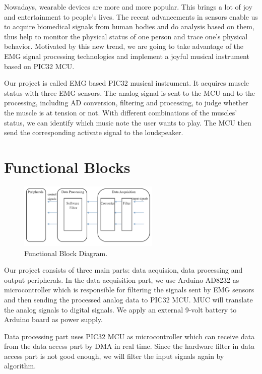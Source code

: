 \documentclass[12pt]{article}
\begin{document}
Nowadays, wearable devices are more and more popular. This brings a lot of joy and entertainment to people’s lives. The recent advancements in sensors enable us to acquire biomedical signals from human bodies and do analysis based on them, thus help to monitor the physical status of one person and trace one’s physical behavior. Motivated by this new trend, we are going to take advantage of the EMG signal processing technologies and implement a joyful musical instrument based on PIC32 MCU. 

Our project is called EMG based PIC32 musical instrument. It acquires muscle status with three EMG sensors. The analog signal is sent to the MCU and to the processing, including AD conversion, filtering and processing, to judge whether the muscle is at tension or not. With different combinations of the muscles’ status, we can identify which music note the user wants to play. The MCU then send the corresponding activate signal to the loudspeaker.


\section{Functional Blocks}
\begin{figure}[H]
\centering
\includegraphics[width=0.6\textwidth]{block-diagram.png}
\caption{Functional Block Diagram.}
\end{figure}

Our project consists of three main parts: data acquision, data processing and output peripherals. In the data acquisition part, we use Arduino AD8232 as microcontroller which is responsible for filtering the signals sent by EMG sensors and then sending the processed analog data to PIC32 MCU. MUC will translate the analog signals to digital signals. We apply an external 9-volt battery to Arduino board as power supply.

Data processing part uses PIC32 MCU as microcontroller which can receive data from the data access part by DMA in real time. Since the hardware filter in data access part is not good enough, we will filter the input signals again by algorithm.
\end{document}
